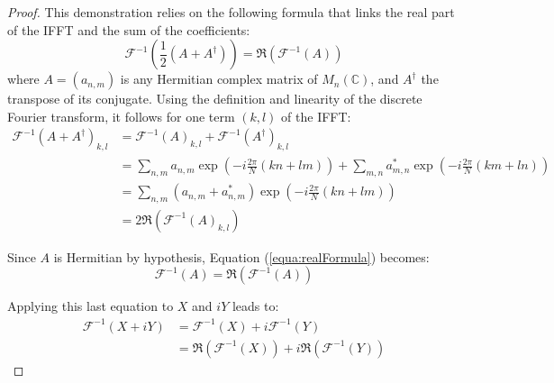 \documentclass[11pt]{article}
\begin{document}
\begin{proof}
	This demonstration relies on the following formula that links the real part of the IFFT and the sum of the coefficients:
	\begin{equation}
		\label{equa:realFormula}
		\mathcal{F}^{-1}\left(\frac{1}{2}\left(A+A^{\dagger}\right)\right) =
		\Re\left(\mathcal{F}^{-1}\left(A\right)\right)
	\end{equation}
	where $A=(a_{n,m})$ is any Hermitian complex matrix of $M_n(\mathbb{C})$, and $A^{\dagger}$ the transpose of its conjugate.
	Using the definition and linearity of the discrete Fourier transform, it follows for one term $(k,l)$ of the IFFT:
	\begin{align}
		\mathcal{F}^{-1}\left(A+A^{\dagger}\right)_{k,l} & =
		\mathcal{F}^{-1}\left(A\right)_{k,l} + \mathcal{F}^{-1}\left(A^{\dagger}\right)_{k,l}\nonumber                                                                                                                  \\
		                                                 & =\sum_{n,m}a_{n,m}\exp\left(-i\frac{2\pi}{N}\left(kn+lm\right)\right) + \sum_{m,n}a_{m,n}^{\ast}\exp\left(-i\frac{2\pi}{N}\left(km+ln\right)\right)\nonumber \\
		                                                 & =\sum_{n,m}(a_{n,m}+a_{n,m}^{\ast})\exp\left(-i\frac{2\pi}{N}\left(kn+lm\right)\right)\nonumber                                                              \\
		                                                 & = 2\Re\left(\mathcal{F}^{-1}\left(A\right)_{k,l}\right)
	\end{align}

	Since $A$ is Hermitian by hypothesis, Equation (\ref{equa:realFormula}) becomes:
	\begin{equation}
		\mathcal{F}^{-1}\left(A\right) = \Re\left(\mathcal{F}^{-1}\left(A\right)\right)
	\end{equation}

	Applying this last equation to $X$ and $iY$ leads to:
	\begin{equation}
		\begin{aligned}
			\mathcal{F}^{-1}\left(X+iY\right) & =
			\mathcal{F}^{-1}\left(X\right) + i\mathcal{F}^{-1}\left(Y\right)                                                                       \\
			                                  & = \Re\left(\mathcal{F}^{-1}\left(X\right)\right) + i\Re\left(\mathcal{F}^{-1}\left(Y\right)\right)
		\end{aligned}
	\end{equation}


\end{proof}
\end{document}
